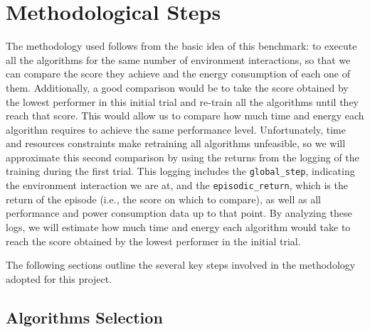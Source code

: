 \section[Methodological Steps]{Methodological Steps}
\label{sec:methodologies}

The methodology used follows from the basic idea of this benchmark: to execute all the algorithms for the same number of environment interactions, so that we can compare the score they achieve and the energy consumption of each one of them. Additionally, a good comparison would be to take the score obtained by the lowest performer in this initial trial and re-train all the algorithms until they reach that score. This would allow us to compare how much time and energy each algorithm requires to achieve the same performance level. Unfortunately, time and resources constraints make retraining all algorithms unfeasible, so we will approximate this second comparison by using the returns from the logging of the training during the first trial. This logging includes the \verb*|global_step|, indicating the environment interaction we are at, and the \verb*|episodic_return|, which is the return of the episode (i.e., the score on which to compare), as well as all performance and power consumption data up to that point. By analyzing these logs, we will estimate how much time and energy each algorithm would take to reach the score obtained by the lowest performer in the initial trial. 

The following sections outline the several key steps involved in the methodology adopted for this project.

\subsection{Algorithms Selection}
\label{subsec:algorithm_selection}
%

